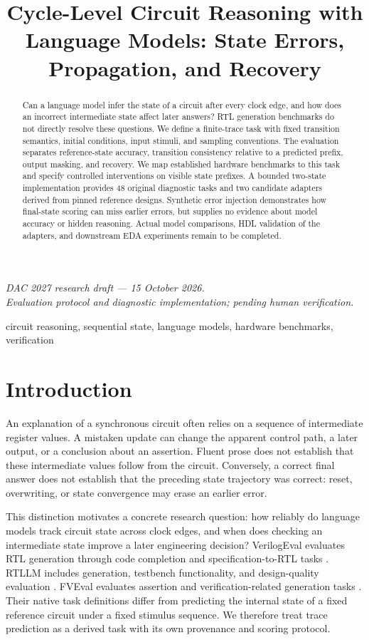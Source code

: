 \documentclass[conference,10pt]{IEEEtran}
\title{Cycle-Level Circuit Reasoning with Language Models: State Errors, Propagation, and Recovery}
\author{\IEEEauthorblockN{Anonymous Authors}}
\begin{document}
\maketitle
\begin{center}\small\textit{DAC 2027 research draft --- 15 October 2026.\\Evaluation protocol and diagnostic implementation; pending human verification.}\end{center}
\begin{abstract}
Can a language model infer the state of a circuit after every clock edge, and how does an incorrect intermediate state affect later answers? RTL generation benchmarks do not directly resolve these questions. We define a finite-trace task with fixed transition semantics, initial conditions, input stimuli, and sampling conventions. The evaluation separates reference-state accuracy, transition consistency relative to a predicted prefix, output masking, and recovery. We map established hardware benchmarks to this task and specify controlled interventions on visible state prefixes. A bounded two-state implementation provides 48 original diagnostic tasks and two candidate adapters derived from pinned reference designs. Synthetic error injection demonstrates how final-state scoring can miss earlier errors, but supplies no evidence about model accuracy or hidden reasoning. Actual model comparisons, HDL validation of the adapters, and downstream EDA experiments remain to be completed.
\end{abstract}
\begin{IEEEkeywords}
circuit reasoning, sequential state, language models, hardware benchmarks, verification
\end{IEEEkeywords}

\section{Introduction}
An explanation of a synchronous circuit often relies on a sequence of intermediate register values. A mistaken update can change the apparent control path, a later output, or a conclusion about an assertion. Fluent prose does not establish that these intermediate values follow from the circuit. Conversely, a correct final answer does not establish that the preceding state trajectory was correct: reset, overwriting, or state convergence may erase an earlier error.

This distinction motivates a concrete research question: how reliably do language models track circuit state across clock edges, and when does checking an intermediate state improve a later engineering decision? VerilogEval evaluates RTL generation through code completion and specification-to-RTL tasks \cite{verilogeval}. RTLLM includes generation, testbench functionality, and design-quality evaluation \cite{rtllm}. FVEval evaluates assertion and verification-related generation tasks \cite{fveval}. Their native task definitions differ from predicting the internal state of a fixed reference circuit under a fixed stimulus sequence. We therefore treat trace prediction as a derived task with its own provenance and scoring protocol.
\end{document}
